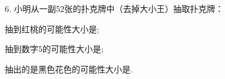6.	小明从一副52张的扑克牌中（去掉大小王）抽取扑克牌：

\begin{subquestions}

    \subquestion 抽到红桃的可能性大小是\key{\hspace{1cm}};

    \subquestion 抽到数字5的可能性大小是\key{\hspace{1cm}};

    \subquestion 抽出的是黑色花色的可能性大小是\key{\hspace{1cm}}.

\end{subquestions}





